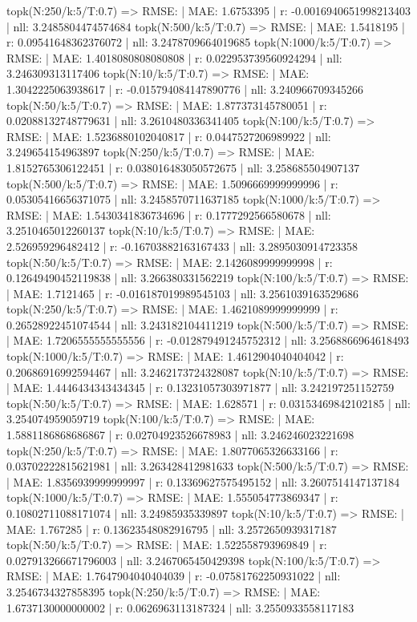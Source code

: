 topk(N:250/k:5/T:0.7) => RMSE: | MAE: 1.6753395 | r: -0.0016940651998213403 | nll: 3.2485804474574684
topk(N:500/k:5/T:0.7) => RMSE: | MAE: 1.5418195 | r: 0.09541648362376072 | nll: 3.2478709664019685
topk(N:1000/k:5/T:0.7) => RMSE: | MAE: 1.4018080808080808 | r: 0.022953739560924294 | nll: 3.246309313117406
topk(N:10/k:5/T:0.7) => RMSE: | MAE: 1.3042225063938617 | r: -0.015794084147890776 | nll: 3.240966709345266
topk(N:50/k:5/T:0.7) => RMSE: | MAE: 1.877373145780051 | r: 0.02088132748779631 | nll: 3.2610480336341405
topk(N:100/k:5/T:0.7) => RMSE: | MAE: 1.5236880102040817 | r: 0.0447527206989922 | nll: 3.249654154963897
topk(N:250/k:5/T:0.7) => RMSE: | MAE: 1.8152765306122451 | r: 0.038016483050572675 | nll: 3.258685504907137
topk(N:500/k:5/T:0.7) => RMSE: | MAE: 1.5096669999999996 | r: 0.05305416656371075 | nll: 3.2458570711637185
topk(N:1000/k:5/T:0.7) => RMSE: | MAE: 1.5430341836734696 | r: 0.1777292566580678 | nll: 3.2510465012260137
topk(N:10/k:5/T:0.7) => RMSE: | MAE: 2.526959296482412 | r: -0.16703882163167433 | nll: 3.2895030914723358
topk(N:50/k:5/T:0.7) => RMSE: | MAE: 2.1426089999999998 | r: 0.12649490452119838 | nll: 3.266380331562219
topk(N:100/k:5/T:0.7) => RMSE: | MAE: 1.7121465 | r: -0.016187019989545103 | nll: 3.2561039163529686
topk(N:250/k:5/T:0.7) => RMSE: | MAE: 1.4621089999999999 | r: 0.26528922451074544 | nll: 3.243182104411219
topk(N:500/k:5/T:0.7) => RMSE: | MAE: 1.7206555555555556 | r: -0.012879491245752312 | nll: 3.2568866964618493
topk(N:1000/k:5/T:0.7) => RMSE: | MAE: 1.4612904040404042 | r: 0.20686916992594467 | nll: 3.2462173724328087
topk(N:10/k:5/T:0.7) => RMSE: | MAE: 1.4446434343434345 | r: 0.13231057303971877 | nll: 3.242197251152759
topk(N:50/k:5/T:0.7) => RMSE: | MAE: 1.628571 | r: 0.03153469842102185 | nll: 3.254074959059719
topk(N:100/k:5/T:0.7) => RMSE: | MAE: 1.5881186868686867 | r: 0.02704923526678983 | nll: 3.246246023221698
topk(N:250/k:5/T:0.7) => RMSE: | MAE: 1.8077065326633166 | r: 0.03702222815621981 | nll: 3.263428412981633
topk(N:500/k:5/T:0.7) => RMSE: | MAE: 1.8356939999999997 | r: 0.13369627575495152 | nll: 3.2607514147137184
topk(N:1000/k:5/T:0.7) => RMSE: | MAE: 1.555054773869347 | r: 0.10802711088171074 | nll: 3.24985935339897
topk(N:10/k:5/T:0.7) => RMSE: | MAE: 1.767285 | r: 0.13623548082916795 | nll: 3.2572650939317187
topk(N:50/k:5/T:0.7) => RMSE: | MAE: 1.522558793969849 | r: 0.027913266671796003 | nll: 3.2467065450429398
topk(N:100/k:5/T:0.7) => RMSE: | MAE: 1.7647904040404039 | r: -0.07581762250931022 | nll: 3.2546734327858395
topk(N:250/k:5/T:0.7) => RMSE: | MAE: 1.6737130000000002 | r: 0.0626963113187324 | nll: 3.2550933558117183
